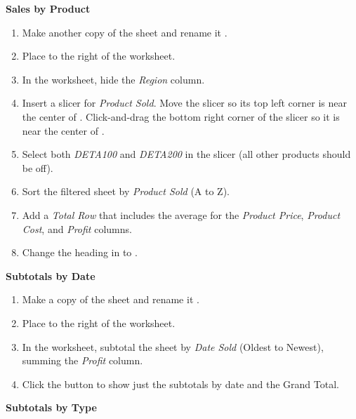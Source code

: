 \noindent
\textbf{Sales by Product}

\begin{enumerate}[resume]
	\item Make another copy of the  sheet and rename it . 
	\item Place  to the right of the  worksheet. 
	\item In the  worksheet, hide the \textit{Region} column.
	\item Insert a slicer for \textit{Product Sold}. Move the slicer so its top left corner is near the center of . Click-and-drag the bottom right corner of the slicer so it is near the center of .
	\item Select both \textit{DETA100} and \textit{DETA200} in the slicer (all other products should be off). 
	\item Sort the filtered sheet by \textit{Product Sold} (A to Z). 
	\item Add a \textit{Total Row} that includes the average for the \textit{Product Price}, \textit{Product Cost}, and \textit{Profit} columns. 
	\item Change the heading in  to .
\end{enumerate}

\noindent
\textbf{Subtotals by Date}

\begin{enumerate}[resume]
	\item Make a copy of the  sheet and rename it . 
	\item Place  to the right of the  worksheet. 
	\item In the  worksheet, subtotal the sheet by \textit{Date Sold} (Oldest to Newest), summing the \textit{Profit} column. 
	\item Click the  button to show just the subtotals by date and the Grand Total.
\end{enumerate}

\noindent
\textbf{Subtotals by Type}


